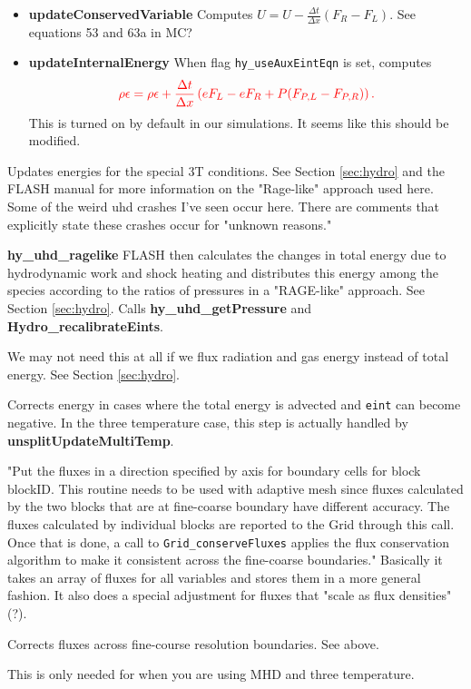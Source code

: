 \documentclass[preprint,11pt]{aastex}
\newcommand{\beq}{\begin{equation}}
\newcommand{\eeq}{\end{equation}}
\begin{document}
\begin{description}
\begin{description}
		\begin{itemize}
			\item \textbf{updateConservedVariable} Computes $U = U-\frac{\Delta t}{\Delta x}\left( F_R - F_L \right)$.  See equations 53 and 63a in MC?
			\item \textbf{updateInternalEnergy} When flag \verb!hy_useAuxEintEqn! is set, computes 
			\beq
			{\color{red}
			\rho \epsilon = \rho \epsilon + \frac{\Delta t}{\Delta x} \left( eF_L - eF_R + P (F_{P,L} - F_{P,R}) \right).
			}
			\eeq
			This is turned on by default in our simulations. {\color{blue} It seems like this should be modified.}
		\end{itemize}
		{\color{red}\item[multiTemp/unsplitUpdateMultiTemp] Updates energies for the special 3T conditions.  See Section \ref{sec:hydro} and the FLASH manual for more information on the "Rage-like" approach used here.  Some of the weird uhd crashes I've seen occur here.  There are comments that explicitly state these crashes occur for "unknown reasons."}
		\begin{itemize}
			{\color{red} \item \textbf{hy\_uhd\_ragelike} FLASH then calculates the changes in total energy due to hydrodynamic work and shock heating and distributes this energy among the species according to the ratios of pressures in a "RAGE-like" approach.  See Section \ref{sec:hydro}.  Calls \textbf{hy\_uhd\_getPressure} and \textbf{Hydro\_recalibrateEints}.} {\color{blue} We may not need this at all if we flux radiation and gas energy instead of total energy.  See Section \ref{sec:hydro}.}
		\end{itemize}
		
		\item[energyFix] Corrects energy in cases where the total energy is advected and \verb!eint! can become negative.  In the three temperature case, this step is actually handled by \textbf{unsplitUpdateMultiTemp}.
		\item[Grid\_putFluxData] "Put the fluxes in a direction specified by axis for boundary cells for block blockID. This routine needs to be used with adaptive mesh since fluxes calculated by the two blocks that are at fine-coarse boundary have different accuracy. The fluxes calculated by individual blocks are reported to  the Grid through this call. Once that is done, a call to \verb!Grid_conserveFluxes! applies the flux conservation algorithm to make it consistent across the fine-coarse boundaries."  Basically it takes an array of fluxes for all variables and stores them in a more general fashion.  It also does a special adjustment for fluxes that "scale as flux densities" (?).
		\item[Grid\_conserveFluxes] Corrects fluxes across fine-course resolution boundaries.  See above.
		\item[Eos\_wrapped]
		\item[putGravityUnsplit]
		\item[addGravityUnsplit]
		\item[energyFix]
		\item[multiTempAfter] This is only needed for when you are using MHD and three temperature.


\end{description}
\end{description}
\end{document}
